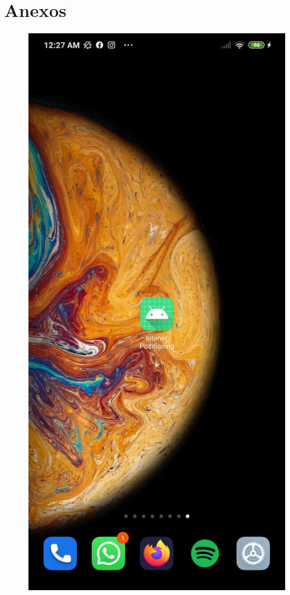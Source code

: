 \documentclass[conference,compsoc,onecolumn]{IEEEtran}
\begin{document}
\section{Anexos}

\begin{figure}[H]
    \centering
    \includegraphics[scale=0.5]{bib/3.PNG}
    \label{fig:1}
\end{figure}
\end{document}
